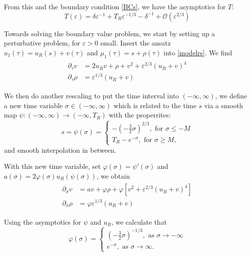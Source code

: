 \documentclass[letterpaper,11pt]{article}
\newcommand{\rmO}{\mathcal{O}}
\newcommand{\eps}{\varepsilon}
\numberwithin{equation}{section}
\theoremstyle{plain}
\begin{document}
From this and the boundary condition \eqref{BCs}, we have the asymptotics for $T$:
\begin{equation}
T (\eps)= \delta \eps^{-1} + T_R\eps^{-1/3} - \delta^{-1} + \rmO(\eps^{2/3})
\end{equation}


Towards solving the boundary value problem, we start by setting up a perturbative problem, for $\eps>0$ small.
Insert the ansatz $u_1(\tau) = u_R(s) + v(\tau)$ and $\mu_1(\tau) = s + \rho(\tau)$ into \eqref{modelrs}. We find
\begin{align}
\begin{split}
\partial_\tau v &= 2u_R v + \rho + v^2 + \eps^{2/3}(u_R+v)^4 \\
\partial_\tau \rho &=  \eps^{1/3}(u_R+v)
\end{split}
\end{align}

We then do another rescaling to put the time interval into $(-\infty, \infty)$, we define a new time variable $\sigma \in (-\infty, \infty)$ which is related to the time $s$ via a smooth map $\psi : (-\infty, \infty) \to (-\infty, T_R)$ with the properrites:
\begin{equation}
s = \psi(\sigma) =\begin{cases}
-(-\frac{3}{2} \sigma)^{2/3} , \text{ for }\sigma \le -M\\
T_R -e^{-\sigma}, \text{ for }\sigma \ge M,
\end{cases}
\end{equation}
and smooth interpolation in between.

With this new time variable, set $\varphi(\sigma) = \psi'(\sigma)$ and $a(\sigma) = 2\varphi(\sigma)u_R(\psi(\sigma))$, we obtain
\begin{align} \label{pertrs}
\begin{split}
\partial_\sigma v &= a v + \varphi \rho +\varphi [v^2 + \eps^{2/3}(u_R+v)^4] \\
\partial_\sigma \rho &=  \varphi\eps^{1/3}(u_R+v)
\end{split}
\end{align}

Using the asymptotics for $\psi$ and $u_R$, we calculate that
\begin{equation}
\varphi(\sigma) =\begin{cases}
 (-\frac{3}{2}\sigma)^{-1/3}, \text{ as }\sigma \to -\infty\\
e^{-\sigma} , \text{ as }\sigma \to \infty.
\end{cases}
\end{equation}
\end{document}
